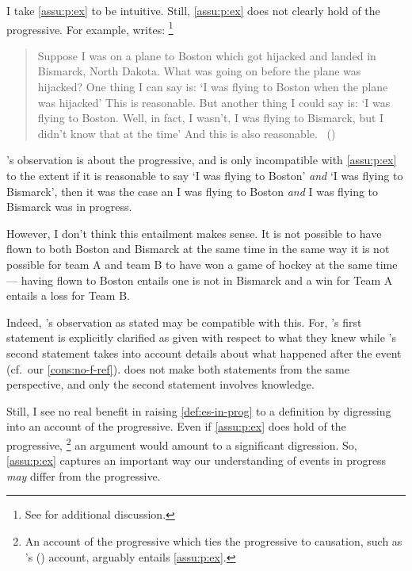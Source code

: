 \begin{note}
  I take \autoref{assu:p:ex} to be intuitive.
  Still, \autoref{assu:p:ex} does not clearly hold of the progressive.
  For example, \citeauthor{Landman:1992wh} writes:%
  \footnote{
    See \textcite{Bonomi:1997uq} for additional discussion.
  }

  \begin{quote}
    Suppose I was on a plane to Boston which got hijacked and landed in Bismarck, North Dakota.
    What was going on before the plane was hijacked?
    One thing I can say is:
    `I was flying to Boston when the plane was hijacked'
    This is reasonable.
    But another thing I could say is:
    `I was flying to Boston.
    Well, in fact, I wasn't, I was flying to Bismarck, but I didn't know that at the time'
    And this is also reasonable.%
    \mbox{ }\hfill\mbox{(\citeyear[30--31]{Landman:1992wh})}
  \end{quote}
  \citeauthor{Landman:1992wh}'s observation is about the progressive, and is only incompatible with \autoref{assu:p:ex} to the extent if it is reasonable to say `I was flying to Boston' \emph{and} `I was flying to Bismarck', then it was the case an  I was flying to Boston \emph{and} I was flying to Bismarck was in progress.

  However, I don't think this entailment makes sense.
  It is not possible to have flown to both Boston and Bismarck at the same time in the same way it is not possible for team A and team B to have won a game of hockey at the same time --- having flown to Boston entails one is not in Bismarck and a win for Team A entails a loss for Team B.

  Indeed, \citeauthor{Landman:1992wh}'s observation as stated may be compatible with this.
  For, \citeauthor{Landman:1992wh}'s first statement is explicitly clarified as given with respect to what they knew while \citeauthor{Landman:1992wh}'s second statement takes into account details about what happened after the event (cf.\ our \autoref{cons:no-f-ref}).
  \citeauthor{Landman:1992wh} does not make both statements from the same perspective, and only the second statement involves knowledge.

  Still, I see no real benefit in raising \autoref{def:es-in-prog} to a definition by digressing into an account of the progressive.
  Even if \autoref{assu:p:ex} does hold of the progressive,%
  \footnote{
    An account of the progressive which ties the progressive to causation, such as \citeauthor{Szabo:2004ul}'s (\citeyear{Szabo:2004ul}) account, arguably entails \autoref{assu:p:ex}.
  }
  an argument would amount to a significant digression.
  So, \autoref{assu:p:ex} captures an important way our understanding of events in progress \emph{may} differ from the progressive.
\end{note}



